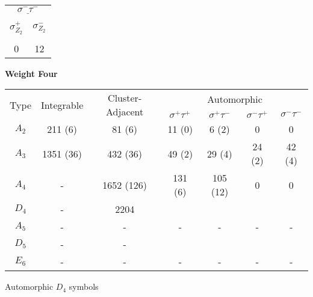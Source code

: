 \documentclass[12pt]{article}
\begin{document}
\begin{center}
\hspace{1.2cm}
\begin{tabular}{| c | c |}
\multicolumn{2}{c}{$\underline{\sigma^- \tau^-}$} \\[-1em]
\multicolumn{1}{c}{} & \multicolumn{1}{c}{} \\
\multicolumn{1}{c}{$\sigma_{Z_2}^+$} & \multicolumn{1}{c}{$\sigma_{Z_2}^-$} \\[-1em]
\multicolumn{1}{c}{} & \multicolumn{1}{c}{} \\
\hline
0 & 12 \\
\hline
\end{tabular} 
\vspace{.6cm}


\newpage

{\bf Weight Four}

\begin{tabular}{ | c | c | c | c | c | c |  c |}
\multicolumn{1}{c}{\multirow{2}{*}{Type}} & \multicolumn{1}{c}{\multirow{2}{*}{Integrable}} & \multicolumn{1}{c}{\multirow{2}{*}{Cluster-Adjacent}} & \multicolumn{4}{c}{Automorphic} \\
\multicolumn{1}{c}{} & \multicolumn{1}{c}{} & \multicolumn{1}{c}{} & \multicolumn{1}{c}{$\sigma^+ \tau^+$} & \multicolumn{1}{c}{$\sigma^+ \tau^-$} & \multicolumn{1}{c}{$\sigma^- \tau^+$} & \multicolumn{1}{c}{$\sigma^- \tau^-$} \\
\hline \(A_2\) & 211 (6) & 81 (6) & 11 (0) & 6 (2) & 0 & 0 \\ 
\hline \(A_3\) & 1351 (36) & 432 (36) & 49 (2) & 29 (4) & 24 (2) & 42 (4) \\ 
\hline \(A_4\) & - & 1652 (126) & 131 (6) & 105 (12) & 0 & 0 \\ 
\hline \(D_4\) & - & 2204  \\ 
\hline \(A_5\) & - & - & - & - & - & - \\ 
\hline \(D_5\) & - & -  \\ 
\hline \(E_6\) & - & - & - & - & - & -  \\ 
\hline
\end{tabular} 
\vspace{.6cm}

Automorphic $D_4$ symbols


\end{center}
\end{document}

